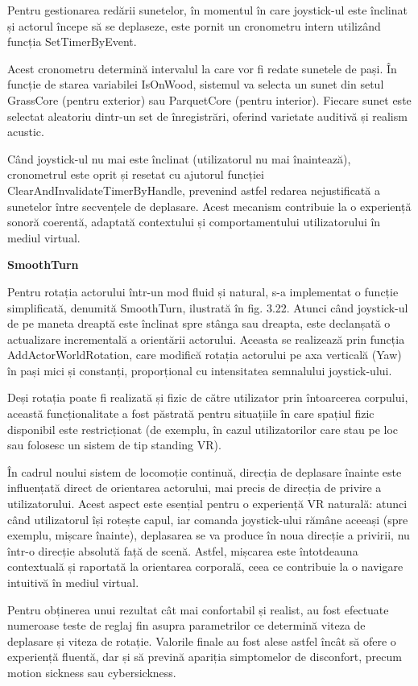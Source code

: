 Pentru gestionarea redării sunetelor, în momentul în care joystick-ul este înclinat și actorul începe să se deplaseze, este pornit un cronometru intern utilizând funcția SetTimerByEvent. 

Acest cronometru determină intervalul la care vor fi redate sunetele de pași. În funcție de starea variabilei IsOnWood, sistemul va selecta un sunet din setul GrassCore (pentru exterior) sau ParquetCore (pentru interior). Fiecare sunet este selectat aleatoriu dintr-un set de înregistrări, oferind varietate auditivă și realism acustic.

Când joystick-ul nu mai este înclinat (utilizatorul nu mai înaintează), cronometrul este oprit și resetat cu ajutorul funcției ClearAndInvalidateTimerByHandle, prevenind astfel redarea nejustificată a sunetelor între secvențele de deplasare. Acest mecanism contribuie la o experiență sonoră coerentă, adaptată contextului și comportamentului utilizatorului în mediul virtual.

\textbf{SmoothTurn}

Pentru rotația actorului într-un mod fluid și natural, s-a implementat o funcție simplificată, denumită SmoothTurn, ilustrată în fig. 3.22. Atunci când joystick-ul de pe maneta dreaptă este înclinat spre stânga sau dreapta, este declanșată o actualizare incrementală a orientării actorului. Aceasta se realizează prin funcția AddActorWorldRotation, care modifică rotația actorului pe axa verticală (Yaw) în pași mici și constanți, proporțional cu intensitatea semnalului joystick-ului.

Deși rotația poate fi realizată și fizic de către utilizator prin întoarcerea corpului, această funcționalitate a fost păstrată pentru situațiile în care spațiul fizic disponibil este restricționat (de exemplu, în cazul utilizatorilor care stau pe loc sau folosesc un sistem de tip standing VR).

În cadrul noului sistem de locomoție continuă, direcția de deplasare înainte este influențată direct de orientarea actorului, mai precis de direcția de privire a utilizatorului. Acest aspect este esențial pentru o experiență VR naturală: atunci când utilizatorul își rotește capul, iar comanda joystick-ului rămâne aceeași (spre exemplu, mișcare înainte), deplasarea se va produce în noua direcție a privirii, nu într-o direcție absolută față de scenă. Astfel, mișcarea este întotdeauna contextuală și raportată la orientarea corporală, ceea ce contribuie la o navigare intuitivă în mediul virtual.

Pentru obținerea unui rezultat cât mai confortabil și realist, au fost efectuate numeroase teste de reglaj fin asupra parametrilor ce determină viteza de deplasare și viteza de rotație. Valorile finale au fost alese astfel încât să ofere o experiență fluentă, dar și să prevină apariția simptomelor de disconfort, precum motion sickness sau cybersickness.

